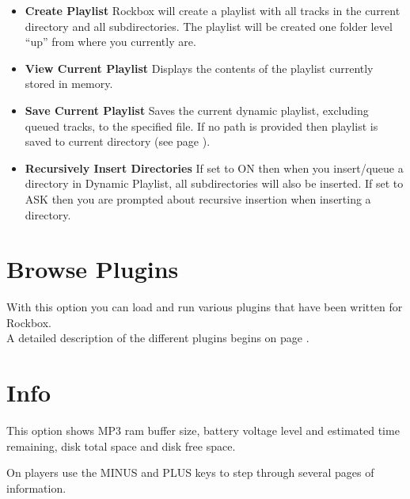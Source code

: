\begin{itemize}
\item \textbf{Create Playlist}
Rockbox will create a playlist with all tracks in the current directory and all subdirectories. The playlist will be created one folder level ``up'' from
where you currently are. 

\item \textbf{View Current Playlist}
Displays the contents of the playlist currently stored in memory.

\item \textbf{Save Current Playlist}
Saves the current dynamic playlist, excluding queued tracks, to the
specified file. If no path is provided then playlist is saved to
current directory (see page \pageref{ref:Playlistsubmenu}).

\item \textbf{Recursively Insert Directories}
If set to ON then when you insert/queue a directory in Dynamic Playlist,
all subdirectories will also be inserted. If set to ASK then you are
prompted about recursive insertion when inserting a directory. 
\end{itemize}

\section{Browse Plugins}
With this option you can load and run various plugins that have been
written for Rockbox.\\

A detailed description of the different plugins begins on page \pageref{ref:Part5}.

\section{\label{ref:Info}Info}
This option shows MP3 ram buffer size, battery voltage level and
estimated time remaining, disk total space and disk free space.

On players use the MINUS and PLUS keys to step through several pages of
information.

